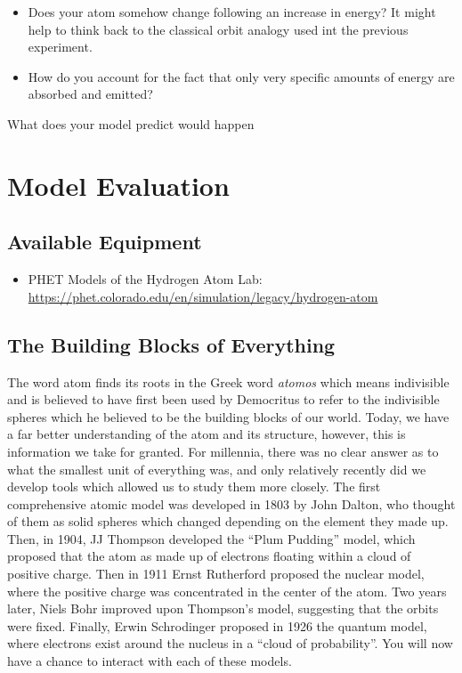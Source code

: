 \begin{steps}
\begin{itemize}
		\item Does your atom somehow change following an increase in energy? It might help to think back to the classical orbit analogy used int the previous experiment.   
		
		\item How do you account for the fact that only very specific amounts of energy are absorbed and emitted? 
	\end{itemize}

	\item What does your model predict would happen
\end{steps}

\section{Model Evaluation}


\subsection{Available Equipment}

\begin{itemize}
	\item PHET Models of the Hydrogen Atom Lab: \url{https://phet.colorado.edu/en/simulation/legacy/hydrogen-atom}
\end{itemize}

\subsection{The Building Blocks of Everything}
 The word atom finds its roots in the Greek word \textit{atomos} which means indivisible and is believed to have first been used by Democritus to refer to the indivisible spheres which he believed to be the building blocks of our world. Today, we have a far better understanding of the atom and its structure, however, this is information we take for granted. For millennia, there was no clear answer as to what the smallest unit of everything was, and only relatively recently did we develop tools which allowed us to study them more closely. The first comprehensive atomic model was developed in 1803 by John Dalton, who thought of them as solid spheres which changed depending on the element they made up. Then, in 1904, JJ Thompson developed the ``Plum Pudding'' model, which proposed that the atom as made up of electrons floating within a cloud of positive charge. Then in 1911 Ernst Rutherford proposed the nuclear model, where the positive charge was concentrated in the center of the atom. Two years later, Niels Bohr improved upon Thompson's model, suggesting that the orbits were fixed. Finally, Erwin Schrodinger proposed in 1926 the quantum model, where electrons exist around the nucleus in a ``cloud of probability''. You will now have a chance to interact with each of these models.

